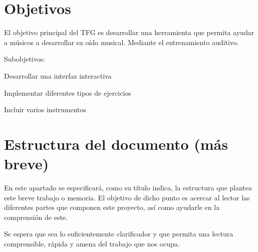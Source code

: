 \documentclass[12pt,twoside,titlepage]{report}
\begin{document}
\section{Objetivos}

El objetivo principal del TFG es desarrollar una herramienta que permita ayudar a músicos a desarrollar su oído musical. Mediante el entrenamiento auditivo.

Subobjetivos:
\begin{compactitem}
    \item Desarrollar una interfaz interactiva
    \item Implementar diferentes tipos de ejercicios 
    \item Incluir varios instrumentos
\end{compactitem}

\section{Estructura del documento (más breve)}

En este apartado se especificará, como su título indica, la estructura que plantea este breve trabajo o memoria. El objetivo de dicho punto es acercar al lector las diferentes partes que componen este proyecto, así como ayudarle en la comprensión de este.

Se espera que sea lo suficientemente clarificador y que permita una lectura comprensible, rápida y amena del trabajo que nos ocupa.
\end{document}
